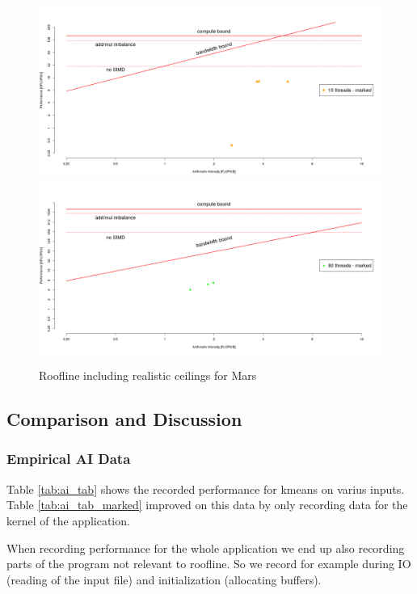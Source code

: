 \begin{figure}[ht]
	\centering
	\includegraphics[scale=.4]{figures/roofline-mars-10tmarked.png}
	\includegraphics[scale=.4]{figures/roofline-mars-80tmarked.png}
	\caption{Roofline including realistic ceilings for Mars}
	\label{fig:runtimex}
\end{figure}


\subsection{Comparison and Discussion}

\subsubsection{Empirical AI Data}

Table \ref{tab:ai_tab} shows the recorded performance for kmeans on varius inputs.
Table \ref{tab:ai_tab_marked} improved on this data by only recording data for the kernel of the application.

When recording performance for the whole application we end up also recording parts of the program not relevant to roofline.
So we record for example during IO (reading of the input file) and initialization (allocating buffers).

